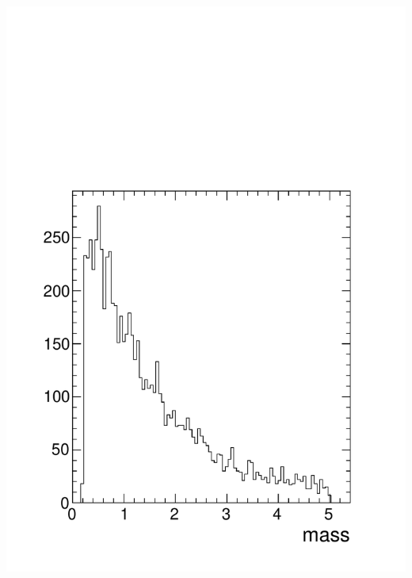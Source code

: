 \documentclass[compress]{beamer}
\begin{document}
\begin{frame}
\begin{columns}
\includegraphics[width=\linewidth]{mass_background.pdf}
\end{columns}
\end{frame}
\end{document}
